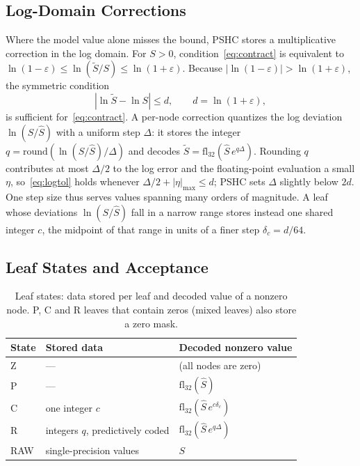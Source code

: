 \documentclass[conference]{IEEEtran}
\newcommand{\fl}{\mathrm{fl}_{32}}
\begin{document}
\subsection{Log-Domain Corrections}

Where the model value alone misses the bound, PSHC stores a multiplicative correction in the log domain. For $S>0$, condition~\eqref{eq:contract} is equivalent to $\ln(1-\varepsilon)\le\ln(\tilde S/S)\le\ln(1+\varepsilon)$. Because $|\ln(1-\varepsilon)|>\ln(1+\varepsilon)$, the symmetric condition
\begin{equation}
|\ln\tilde S-\ln S|\le d,\qquad d=\ln(1+\varepsilon),
\label{eq:logtol}
\end{equation}
is sufficient for~\eqref{eq:contract}. A per-node correction quantizes the log deviation $\ln(S/\hat S)$ with a uniform step $\Delta$: it stores the integer $q=\mathrm{round}(\ln(S/\hat S)/\Delta)$ and decodes $\tilde S=\fl(\hat S\,e^{q\Delta})$. Rounding $q$ contributes at most $\Delta/2$ to the log error and the floating-point evaluation a small $\eta$, so~\eqref{eq:logtol} holds whenever $\Delta/2+|\eta|_{\max}\le d$; PSHC sets $\Delta$ slightly below $2d$. One step size thus serves values spanning many orders of magnitude. A leaf whose deviations $\ln(S/\hat S)$ fall in a narrow range stores instead one shared integer $c$, the midpoint of that range in units of a finer step $\delta_c=d/64$.

\subsection{Leaf States and Acceptance}

\begin{table}[t]
\caption{Leaf states: data stored per leaf and decoded value of a nonzero node. P, C and R leaves that contain zeros (mixed leaves) also store a zero mask.}
\label{tab:states}
\centering
\footnotesize
\setlength{\tabcolsep}{4pt}
\begin{tabular}{lll}
\hline
State & Stored data & Decoded nonzero value\\
\hline
Z & --- & (all nodes are zero)\\
P & --- & $\fl(\hat S)$\\
C & one integer $c$ & $\fl(\hat S\,e^{c\delta_c})$\\
R & integers $q$, predictively coded & $\fl(\hat S\,e^{q\Delta})$\\
RAW & single-precision values & $S$\\
\hline
\end{tabular}
\end{table}
\end{document}
